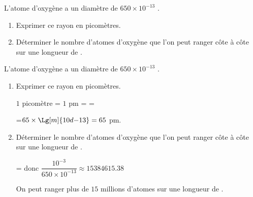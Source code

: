 \begin{exercice*}
    L’atome d’oxygène a un diamètre de $650 \times 10^{-13}$ \Lg[m]{}.
    \begin{enumerate}
        \item Exprimer ce rayon en picomètres.
        \item Déterminer le nombre d'atomes d’oxygène que l'on peut ranger côte à côte sur une longueur de .
    \end{enumerate}    
\end{exercice*}
\begin{corrige}
    L’atome d’oxygène a un diamètre de $650 \times 10^{-13}$ \Lg[m]{}.

    \begin{enumerate}
        \item Exprimer ce rayon en picomètres.
        
        {\red $1$ picomètre = $1$ pm =  = 
        
        =$65\times\Lg[m]{10d{-13}}=65$ pm.
        }
        \item Déterminer le nombre d'atomes d’oxygène que l'on peut ranger côte à côte sur une longueur de .
        
        {\red {} =  donc $\dfrac{10^{-3}}{650\times 10^{-13}}\approx\num{15384615.38}$
        
        On peut ranger plus de $15$ millions d'atomes sur une longueur de .
        }
    \end{enumerate}    
\end{corrige}

